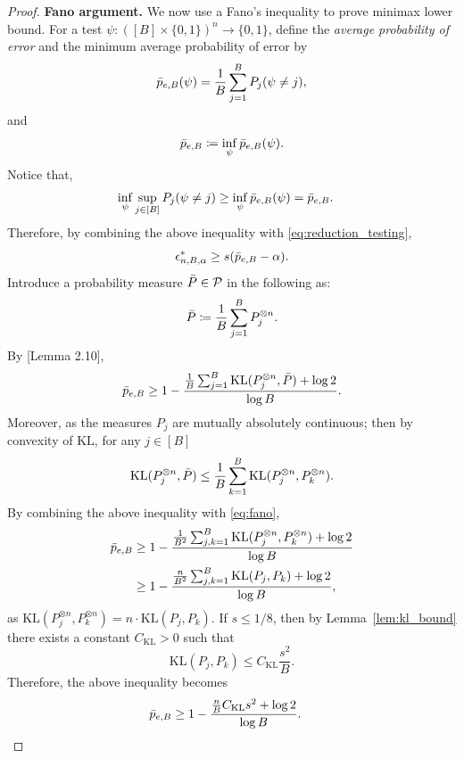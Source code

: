 \documentclass{article}
\theoremstyle{plain}
\theoremstyle{definition}
\theoremstyle{remark}
\begin{document}
\begin{proof}
    \textbf{Fano argument.} We now use a Fano's inequality to prove minimax lower bound. For a test $\psi: ([B] \times \{0,1\})^n \to \{0,1\}$, define the \textit{ average probability of error} and the minimum average probability of error by
    $$
    \Bar{p}_{e, B}(\psi) = \frac{1}{B}\sum_{j=1}^B P_j(\psi \neq j),
    $$
    and 
    $$
    \Bar{p}_{e,B} \coloneqq \inf_\psi \Bar{p}_{e, B}(\psi). 
    $$
    Notice that,
    \begin{align*}
         \inf_\psi \sup_{j \in [B]} P_j(\psi \neq j) &\geq   \inf_\psi \Bar{p}_{e,B}(\psi) = \Bar{p}_{e,B}.
    \end{align*}
    Therefore, by combining the above inequality with \eqref{eq:reduction_testing},
    \begin{equation}
        \label{eq:reduction_mean_error}
            \mathfrak \epsilon^*_{n,B, \alpha}  \geq s( \Bar{p}_{e,B} - \alpha).
    \end{equation}
Introduce a probability measure $\Bar{P} \in \mathcal{P}$ in the following as:
    $$
    \Bar{P} \coloneqq \frac{1}{B}\sum_{j=1}^B
 P_j^{\otimes n}. $$
 By \cite{Tsybakov2009IntroNonparametric}[Lemma 2.10],
\begin{equation}
\label{eq:fano}
    \Bar{p}_{e,B} \geq 1 - \frac{\frac{1}{B}\sum_{j=1}^B \mathrm{KL}(P_j^{\otimes n}, \Bar{P})  + \log 2}{\log B}. 
\end{equation}
Moreover, as the measures $P_j$ are mutually absolutely continuous; then by convexity of $\mathrm{KL}$, for any $j \in [B]$
$$
\mathrm{KL}(P_j^{\otimes n}, \Bar{P}) \leq \frac{1}{B}\sum_{k=1}^B \mathrm{KL}(P_j^{\otimes n}, P_k^{\otimes n}).
$$
By combining the above inequality with \eqref{eq:fano},
    \begin{align*}
        \Bar{p}_{e,B} 
        &\geq 1 - \frac{\frac{1}{B^2}\sum_{j,k=1}^B \mathrm{KL}(P_j^{\otimes n}, P_k^{\otimes n})  + \log 2}{\log B} \\
        &\geq 1 - \frac{\frac{n}{B^2}\sum_{j,k=1}^B \mathrm{KL}(P_j, P_k)  + \log 2}{\log B},
    \end{align*}
as $\mathrm{KL}(P_j^{\otimes n}, P_k^{\otimes n}) = n \cdot  \mathrm{KL}(P_j, P_k).$ If $s \leq 1/8$, then by Lemma~\ref{lem:kl_bound} there exists a constant $C_\mathrm{KL} > 0$ such that $$\mathrm{KL}(P_j, P_k) \leq C_\mathrm{KL}\frac{s^2}{B}.$$ Therefore, the above inequality becomes
\begin{align*}
     \Bar{p}_{e,B}  &\geq 1 - \frac{\frac{n}{B} C_\mathrm{KL}s^2  + \log 2}{\log B}.
\end{align*}


\end{proof}
\end{document}
